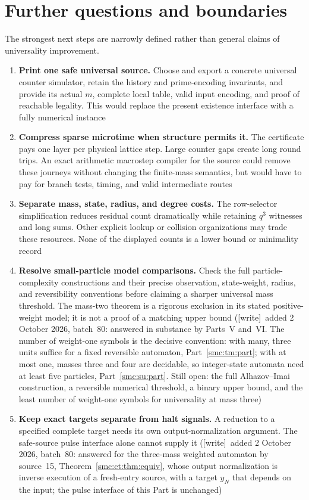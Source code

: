 \documentclass[11pt,letterpaper]{article}
\numberwithin{equation}{section}
\theoremstyle{definition}
\theoremstyle{remark}
\newcommand{\wtag}{\textup{[write]}}
\begin{document}
\section{Further questions and boundaries}\label{smc:sl:sec:questions}
The strongest next steps are narrowly defined rather than general claims of universality improvement.
\begin{enumerate}
\item \textbf{Print one safe universal source.} Choose and export a concrete universal counter simulator, retain the history and prime-encoding invariants, and provide its actual $m$, complete local table, valid input encoding, and proof of reachable legality. This would replace the present existence interface with a fully numerical instance
\item \textbf{Compress sparse microtime when structure permits it.} The certificate pays one layer per physical lattice step. Large counter gaps create long round trips. An exact arithmetic macrostep compiler for the source could remove these journeys without changing the finite-mass semantics, but would have to pay for branch tests, timing, and valid intermediate routes
\item \textbf{Separate mass, state, radius, and degree costs.} The row-selector simplification reduces residual count dramatically while retaining $q^3$ witnesses and long sums. Other explicit lookup or collision organizations may trade these resources. None of the displayed counts is a lower bound or minimality record
\item \textbf{Resolve small-particle model comparisons.} Check the full particle-complexity constructions and their precise observation, state-weight, radius, and reversibility conventions before claiming a sharper universal mass threshold. The mass-two theorem is a rigorous exclusion in its stated positive-weight model; it is not a proof of a matching upper bound (\wtag\ added 2 October 2026, batch~80: answered in substance by Parts~V and~VI. The number of weight-one symbols is the decisive convention: with many, three units suffice for a fixed reversible automaton, Part~\ref{smc:tm:part}; with at most one, masses three and four are decidable, so integer-state automata need at least five particles, Part~\ref{smc:su:part}. Still open: the full Alhazov--Imai construction, a reversible numerical threshold, a binary upper bound, and the least number of weight-one symbols for universality at mass three)
\item \textbf{Keep exact targets separate from halt signals.} A reduction to a specified complete target needs its own output-normalization argument. The safe-source pulse interface alone cannot supply it (\wtag\ added 2 October 2026, batch~80: answered for the three-mass weighted automaton by source~15, Theorem~\ref{smc:ct:thm:equiv}, whose output normalization is inverse execution of a fresh-entry source, with a target $y_N$ that depends on the input; the pulse interface of this Part is unchanged)
\end{enumerate}
\end{document}
